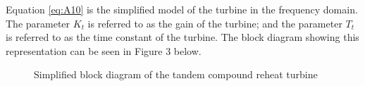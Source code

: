 Equation \ref{eq:A10} is the simplified model of the turbine in the frequency domain. The parameter $K_t$ is referred to as the gain of the turbine; and the parameter $T_t$ is referred to as the time constant of the turbine. The block diagram showing this representation can be seen in Figure 3 below.   

\begin{figure}[h]
	\centering
	
	\caption[Simplified turbine model]{Simplified block diagram of the tandem compound reheat turbine}
	\label{fig:A05_turbine_model}
\end{figure}